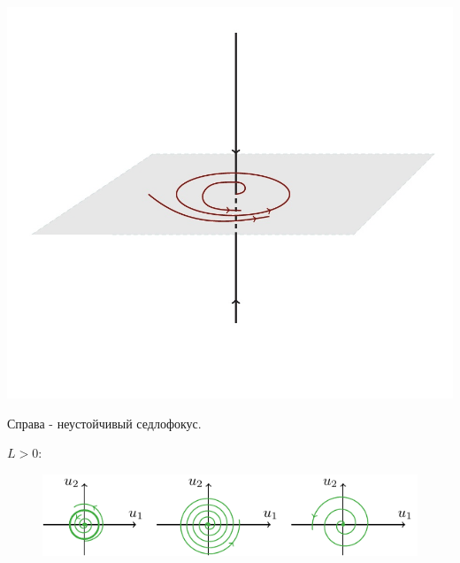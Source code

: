 \begin{center}
\begin{minipage}{0.3\linewidth}
        \includegraphics[width=\linewidth]{fig/55_3.jpg} 
        \vspace{-50pt}
        \label{fig:1}
    \end{minipage}    
\end{center}

Справа - неустойчивый седлофокус.

$L>0:$
\begin{figure}[H]
	\centering
	\includegraphics[scale=1.5]{fig/fig58.pdf}   
\end{figure}

